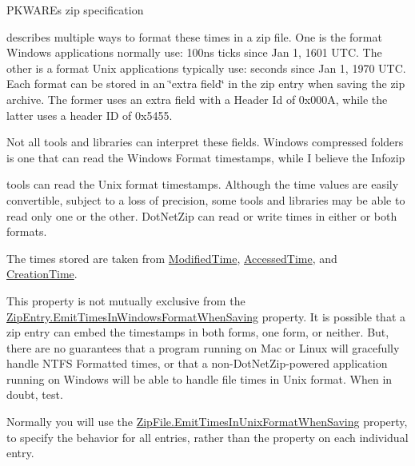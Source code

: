 P\+K\+W\+A\+RE\textquotesingle{}s zip specification

describes multiple ways to format these times in a zip file. One is the format Windows applications normally use\+: 100ns ticks since Jan 1, 1601 U\+TC. The other is a format Unix applications typically use\+: seconds since Jan 1, 1970 U\+TC. Each format can be stored in an \char`\"{}extra field\char`\"{} in the zip entry when saving the zip archive. The former uses an extra field with a Header Id of 0x000A, while the latter uses a header ID of 0x5455. 

Not all tools and libraries can interpret these fields. Windows compressed folders is one that can read the Windows Format timestamps, while I believe the Infozip

tools can read the Unix format timestamps. Although the time values are easily convertible, subject to a loss of precision, some tools and libraries may be able to read only one or the other. Dot\+Net\+Zip can read or write times in either or both formats. 

The times stored are taken from \mbox{\hyperlink{class_super_tiled2_unity_1_1_ionic_1_1_zip_1_1_zip_entry_a88021d72ea8b94c762388d92d74c2e0d}{Modified\+Time}}, \mbox{\hyperlink{class_super_tiled2_unity_1_1_ionic_1_1_zip_1_1_zip_entry_abc1a038c251f1ed0e2c1435a5bab23fd}{Accessed\+Time}}, and \mbox{\hyperlink{class_super_tiled2_unity_1_1_ionic_1_1_zip_1_1_zip_entry_a38ef2ae810c3b89b1f23ebea918fb60e}{Creation\+Time}}. 

This property is not mutually exclusive from the \mbox{\hyperlink{class_super_tiled2_unity_1_1_ionic_1_1_zip_1_1_zip_entry_affabc22ba72be27e9134676becddcec7}{Zip\+Entry.\+Emit\+Times\+In\+Windows\+Format\+When\+Saving}} property. It is possible that a zip entry can embed the timestamps in both forms, one form, or neither. But, there are no guarantees that a program running on Mac or Linux will gracefully handle N\+T\+FS Formatted times, or that a non-\/\+Dot\+Net\+Zip-\/powered application running on Windows will be able to handle file times in Unix format. When in doubt, test. 

Normally you will use the \mbox{\hyperlink{class_super_tiled2_unity_1_1_ionic_1_1_zip_1_1_zip_file_af369a36c1bf83fc28466fe15c095ea87}{Zip\+File.\+Emit\+Times\+In\+Unix\+Format\+When\+Saving}} property, to specify the behavior for all entries, rather than the property on each individual entry. 


